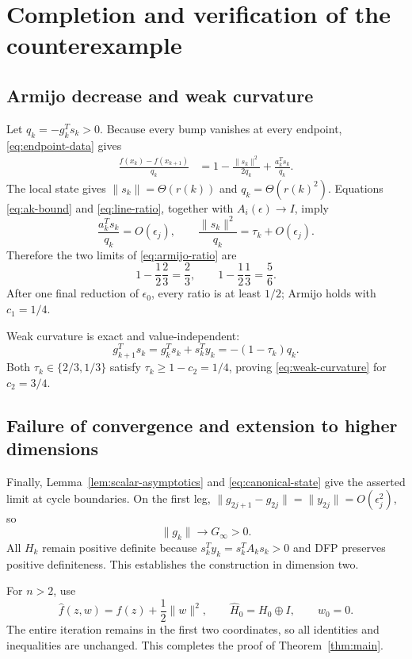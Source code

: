 \documentclass[smallextended,envcountsame]{svjour3}
\begin{document}
\section{Completion and verification of the counterexample}
\label{sec:verification}

\subsection{Armijo decrease and weak curvature}

Let $q_k=-g_k^Ts_k>0$.  Because every bump vanishes at every endpoint,
\eqref{eq:endpoint-data} gives
\begin{align}
\frac{f(x_k)-f(x_{k+1})}{q_k}
&=1-\frac{\|s_k\|^2}{2q_k}
+\frac{a_k^Ts_k}{q_k}.
\label{eq:armijo-ratio}
\end{align}
The local state gives $\|s_k\|=\Theta(r(k))$ and
$q_k=\Theta(r(k)^2)$.  Equations \eqref{eq:ak-bound} and
\eqref{eq:line-ratio}, together with $A_i(\epsilon)\to I$, imply
\[
\frac{a_k^Ts_k}{q_k}=O(\epsilon_j),
\qquad
\frac{\|s_k\|^2}{q_k}=\tau_k+O(\epsilon_j).
\]
Therefore the two limits of \eqref{eq:armijo-ratio} are
\[
1-\frac12\frac23=\frac23,
\qquad
1-\frac12\frac13=\frac56.
\]
After one final reduction of $\epsilon_0$, every ratio is at least $1/2$;
Armijo holds with $c_1=1/4$.

Weak curvature is exact and value-independent:
\[
g_{k+1}^Ts_k=g_k^Ts_k+s_k^Ty_k
=-(1-\tau_k)q_k.
\]
Both $\tau_k\in\{2/3,1/3\}$ satisfy
$\tau_k\ge1-c_2=1/4$, proving \eqref{eq:weak-curvature} for $c_2=3/4$.

\subsection{Failure of convergence and extension to higher dimensions}

Finally, Lemma~\ref{lem:scalar-asymptotics} and
\eqref{eq:canonical-state} give the asserted limit at cycle boundaries.  On
the first leg,
$\|g_{2j+1}-g_{2j}\|=\|y_{2j}\|=O(\epsilon_j^2)$, so
\[
\|g_k\|\longrightarrow G_\infty>0.
\]
All $H_k$ remain positive definite because $s_k^Ty_k=s_k^TA_ks_k>0$ and
DFP preserves positive definiteness.  This establishes the construction in
dimension two.

For $n>2$, use
\[
\widehat f(z,w)=f(z)+\frac12\|w\|^2,
\qquad
\widehat H_0=H_0\oplus I,
\qquad w_0=0.
\]
The entire iteration remains in the first two coordinates, so all identities
and inequalities are unchanged.  This completes the proof of
Theorem~\ref{thm:main}.
\end{document}
